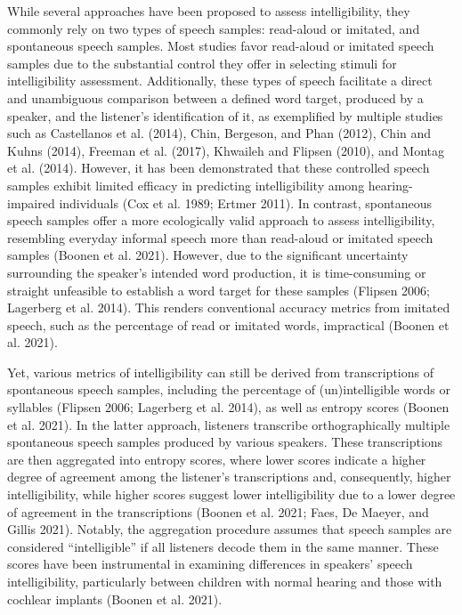 \documentclass[
sn-apacite
]{sn-jnl}
\begin{document}
While several approaches have been proposed to assess intelligibility,
they commonly rely on two types of speech samples: read-aloud or
imitated, and spontaneous speech samples. Most studies favor read-aloud
or imitated speech samples due to the substantial control they offer in
selecting stimuli for intelligibility assessment. Additionally, these
types of speech facilitate a direct and unambiguous comparison between a
defined word target, produced by a speaker, and the listener's
identification of it, as exemplified by multiple studies such as
Castellanos et al. (2014), Chin, Bergeson, and Phan (2012), Chin and
Kuhns (2014), Freeman et al. (2017), Khwaileh and Flipsen (2010), and
Montag et al. (2014). However, it has been demonstrated that these
controlled speech samples exhibit limited efficacy in predicting
intelligibility among hearing-impaired individuals (Cox et al. 1989;
Ertmer 2011). {In contrast, spontaneous speech samples offer a more
ecologically valid approach to assess intelligibility, resembling
everyday informal speech more than read-aloud or imitated speech samples
(Boonen et al. 2021). However, due to the significant uncertainty
surrounding the speaker's intended word production, it is time-consuming
or straight unfeasible to establish a word target for these samples
(Flipsen 2006; Lagerberg et al. 2014). This renders conventional
accuracy metrics from imitated speech, such as the percentage of read or
imitated words, impractical (Boonen et al. 2021).}

{Yet, various metrics of intelligibility can still be derived from
transcriptions of spontaneous speech samples, including the percentage
of (un)intelligible words or syllables (Flipsen 2006; Lagerberg et al.
2014), as well as entropy scores (Boonen et al. 2021). In the latter
approach,} listeners transcribe orthographically multiple spontaneous
speech samples produced by various speakers. These transcriptions are
then aggregated into entropy scores, where lower scores indicate a
higher degree of agreement among the listener's transcriptions and,
consequently, higher intelligibility, while higher scores suggest lower
intelligibility due to a lower degree of agreement in the transcriptions
(Boonen et al. 2021; Faes, De Maeyer, and Gillis 2021). Notably, the
aggregation procedure assumes that speech samples are considered
``intelligible'' if all listeners decode them in the same manner. These
scores have been instrumental in examining differences in speakers'
speech intelligibility, particularly between children with normal
hearing and those with cochlear implants (Boonen et al. 2021).
\end{document}
